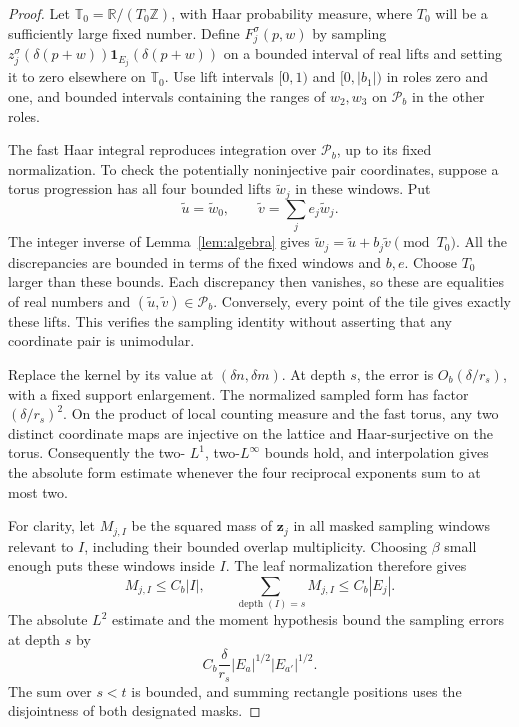 \begin{proof}
Let \(\mathbb T_0=\mathbb R/(T_0\mathbb Z)\), with Haar probability
measure, where \(T_0\) will be a sufficiently large fixed number.
Define \(F_j^\sigma(p,w)\) by sampling
\(z_j^\sigma(\delta(p+w))\mathbf1_{E_j}(\delta(p+w))\)
on a bounded interval of real lifts and setting it to zero elsewhere
on \(\mathbb T_0\).  Use lift intervals \([0,1)\) and
\([0,|b_1|)\) in roles zero and one, and bounded intervals containing
the ranges of \(w_2,w_3\) on \(\mathcal P_b\) in the other roles.

The fast Haar integral reproduces integration over \(\mathcal P_b\),
up to its fixed normalization.  To check the potentially noninjective
pair coordinates, suppose a torus progression has all four bounded
lifts \(\widetilde w_j\) in these windows.  Put
\[
 \widetilde u=\widetilde w_0,\qquad
 \widetilde v=\sum_j e_j\widetilde w_j.
\]
The integer inverse of Lemma~\ref{lem:algebra} gives
\(\widetilde w_j=\widetilde u+b_j\widetilde v\pmod {T_0}\).
All the discrepancies are bounded in terms of the fixed windows and
\(b,e\).  Choose \(T_0\) larger than these bounds.  Each discrepancy
then vanishes, so these are equalities of real numbers and
\((\widetilde u,\widetilde v)\in\mathcal P_b\).  Conversely, every
point of the tile gives exactly these lifts.  This verifies the sampling
identity without asserting that any coordinate pair is unimodular.

Replace the kernel by its value at \((\delta n,\delta m)\).
At depth \(s\), the error is \(O_b(\delta/r_s)\), with a fixed support
enlargement.  The normalized sampled form has factor
\((\delta/r_s)^2\).  On the product of local counting measure and
the fast torus, any two distinct coordinate maps are injective on the
lattice and Haar-surjective on the torus.  Consequently the two-
\(L^1\), two-\(L^\infty\) bounds hold, and interpolation gives the
absolute form estimate whenever the four reciprocal exponents sum to
at most two.

For clarity, let \(M_{j,I}\) be the squared mass of \(\mathbf z_j\)
in all masked sampling windows relevant to \(I\), including their
bounded overlap multiplicity.  Choosing \(\beta\) small enough puts
these windows inside \(I\).  The leaf normalization therefore gives
\[
 M_{j,I}\le C_b|I|,\qquad
 \sum_{\operatorname{depth}(I)=s}M_{j,I}\le C_b|E_j|.
\]
The absolute \(L^2\) estimate and the moment hypothesis bound the
sampling errors at depth \(s\) by
\[
 C_b\frac{\delta}{r_s}|E_a|^{1/2}|E_{a'}|^{1/2}.
\]
The sum over \(s<t\) is bounded, and summing rectangle positions uses
the disjointness of both designated masks.


\end{proof}
